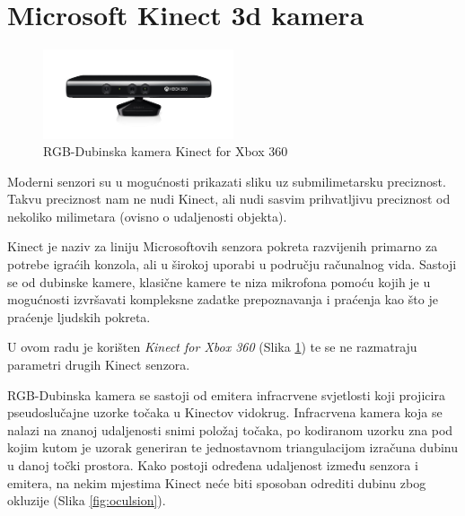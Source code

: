 \documentclass[times, utf8, diplomski, numeric]{fer}
\begin{document}
\section{Microsoft Kinect 3d kamera}\label{sec:kinect}
\begin{figure}[h!]
    \centering
    \includegraphics[width=0.5\textwidth]{detekcija/kinect}
	\caption{RGB-Dubinska kamera Kinect for Xbox 360}
	\label{fig:kinect}
\end{figure}

Moderni senzori su u mogućnosti prikazati sliku uz submilimetarsku preciznost. Takvu preciznost nam ne nudi Kinect, ali nudi sasvim prihvatljivu preciznost od nekoliko milimetara (ovisno o udaljenosti objekta).

Kinect je naziv za liniju Microsoftovih senzora pokreta razvijenih primarno za potrebe igraćih konzola, ali u širokoj uporabi u području računalnog vida. Sastoji se od dubinske kamere, klasične kamere te niza mikrofona pomoću kojih je u mogućnosti izvršavati kompleksne zadatke prepoznavanja i praćenja kao što je praćenje ljudskih pokreta.

U ovom radu je korišten \textit{Kinect for Xbox 360} \cite{kinect} (Slika \ref{fig:kinect}) te se ne razmatraju parametri drugih Kinect senzora.

RGB-Dubinska kamera se sastoji od emitera infracrvene svjetlosti koji projicira pseudoslučajne uzorke točaka u Kinectov vidokrug. Infracrvena kamera koja se nalazi na znanoj udaljenosti snimi položaj točaka, po kodiranom uzorku zna pod kojim kutom je uzorak generiran te jednostavnom triangulacijom izračuna dubinu u danoj točki prostora. Kako postoji određena udaljenost između senzora i emitera, na nekim mjestima Kinect neće biti sposoban odrediti dubinu zbog okluzije (Slika \ref{fig:oculsion}).
\end{document}
